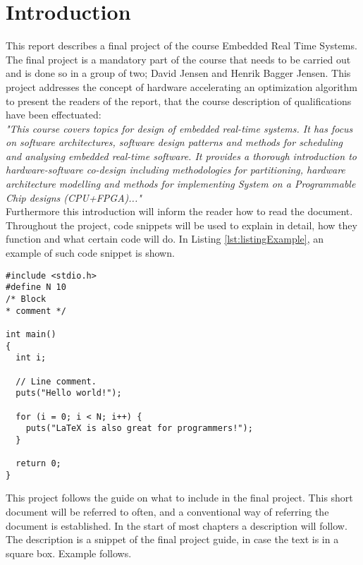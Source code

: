 \section{Introduction}

This report describes a final project of the course Embedded Real Time Systems. The final project is a mandatory part of the course that needs to be carried out and is done so in a group of two; David Jensen and Henrik Bagger Jensen. This project addresses the concept of hardware accelerating an optimization algorithm to present the readers of the report, that the course description of qualifications have been effectuated:\\

\textit{"This course covers topics for design of embedded real-time systems. It has focus on software architectures, software design patterns and methods for scheduling and analysing embedded real-time software. It provides a thorough introduction to hardware-software co-design including methodologies for partitioning, hardware architecture modelling and methods for implementing System on a Programmable Chip designs (CPU+FPGA)..."}\\

Furthermore this introduction will inform the reader how to read the document. \\

Throughout the project, code snippets will be used to explain in detail, how they function and what certain code will do. In Listing \ref{lst:listingExample}, an example of such code snippet is shown.

\begin{lstlisting}[style=customc++, label={lst:listingExample}, caption={Example listing.}]
#include <stdio.h>
#define N 10
/* Block
* comment */

int main()
{
  int i;

  // Line comment.
  puts("Hello world!");

  for (i = 0; i < N; i++) {
    puts("LaTeX is also great for programmers!");
  }
  
  return 0;
}
\end{lstlisting}

This project follows the guide on what to include in the final project\cite{Bjerge2017}. This short document will be referred to often, and a conventional way of referring the document is established. In the start of most chapters a description will follow. The description is a snippet of the final project guide, in case the text is in a square box. Example follows.\\

